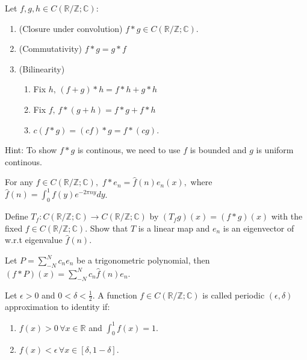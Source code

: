 \documentclass[12pt]{article}
\begin{document}
\begin{property}
Let $f,g,h\in C(\mathbb{R}/\mathbb{Z}; \mathbb{C})$:
\begin{enumerate}
    \item (Closure under convolution) $f*g\in C(\mathbb{R}/\mathbb{Z}; \mathbb{C}).$
    \item (Commutativity) $f*g = g*f$
    \item (Bilinearity) 
    \begin{enumerate}
        \item Fix $h, \,(f+g)*h = f*h + g*h$
        \item Fix $f, \, f*(g+h)=f*g + f*h$
        \item $c(f*g)=(cf)*g=f*(cg).$
    \end{enumerate}
\end{enumerate}    
\end{property}

\begin{pfbox}
Hint: To show $f*g$ is continous, we need to use $f$ is bounded and $g$ is uniform continous.
\end{pfbox}


\begin{theorem}
    For any $f\in C(\mathbb{R}/\mathbb{Z}; \mathbb{C}),$
    $f*e_n=\hat{f}(n)e_n(x),$ where $\hat{f}(n)=\int_{0}^{1}f(y)e^{-2\pi ny}dy$.
\end{theorem}

\begin{exercise}
Define $T_f:  C(\mathbb{R}/\mathbb{Z}; \mathbb{C})\rightarrow  C(\mathbb{R}/\mathbb{Z}; \mathbb{C})$ by
$(T_f g)(x)=(f*g)(x)$ with the fixed $f\in C(\mathbb{R}/\mathbb{Z}; \mathbb{C})$.
Show that $T$ is a linear map and $e_n$ is an eigenvector of  w.r.t eigenvalue $\hat{f}(n)$.
\end{exercise}

\begin{lemma}
    Let $P = \sum_{-N}^{N}c_n e_n$ be a trigonometric polynomial, then $(f*P)(x) = \sum_{-N}^{N}c_n\hat{f}(n)e_n$.
\end{lemma}


\begin{definition}
    Let $\epsilon>0$ and $0<\delta<\frac{1}{2}$. A function $f\in C(\mathbb{R}/\mathbb{Z}; \mathbb{C})$ is called periodic $(\epsilon, \delta)$ approximation to identity if:
    \begin{enumerate}
        \item $f(x)>0\,\forall x\in\mathbb{R}$ and $\int_{0}^{1} f(x)=1$.
        \item $f(x)<\epsilon\, \forall x\in[\delta, 1-\delta]$.
    \end{enumerate}
\end{definition}
\end{document}
